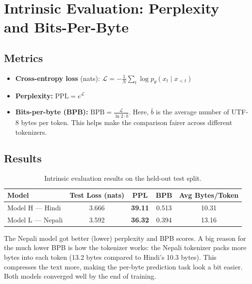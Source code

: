 \documentclass[11pt,a4paper]{article}
\begin{document}
\section{Intrinsic Evaluation: Perplexity and Bits-Per-Byte}

\subsection{Metrics}

\begin{itemize}
    \item \textbf{Cross-entropy loss} (nats): $\mathcal{L} = -\frac{1}{N}\sum_{t} \log p_\theta(x_t \mid x_{<t})$
    \item \textbf{Perplexity:} $\text{PPL} = e^{\mathcal{L}}$
    \item \textbf{Bits-per-byte (BPB):} $\text{BPB} = \frac{\mathcal{L}}{\ln 2 \cdot \bar{b}}$. Here, $\bar{b}$ is the average number of UTF-8 bytes per token. This helps make the comparison fairer across different tokenizers.
\end{itemize}

\subsection{Results}

\begin{table}[H]
\centering
\caption{Intrinsic evaluation results on the held-out test split.}
\label{tab:intrinsic}
\begin{tabular}{lcccc}
\toprule
\textbf{Model} & \textbf{Test Loss (nats)} & \textbf{PPL} & \textbf{BPB} & \textbf{Avg Bytes/Token} \\
\midrule
Model H --- Hindi  & 3.666 & \textbf{39.11} & 0.513 & 10.31 \\
Model L --- Nepali & 3.592 & \textbf{36.32} & 0.394 & 13.16 \\
\bottomrule
\end{tabular}
\end{table}

The Nepali model got better (lower) perplexity and BPB scores. A big reason for the much lower BPB is how the tokenizer works: the Nepali tokenizer packs more bytes into each token (13.2 bytes compared to Hindi's 10.3 bytes). This compresses the text more, making the per-byte prediction task look a bit easier. Both models converged well by the end of training.
\end{document}
